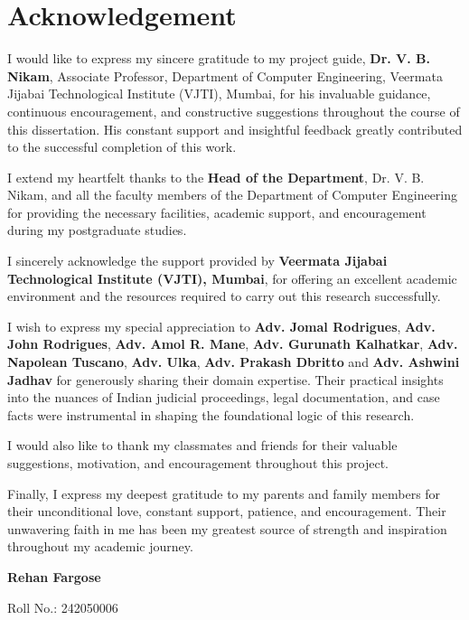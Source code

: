 
\clearpage

\chapter*{Acknowledgement}


\thispagestyle{plain}

I would like to express my sincere gratitude to my project guide, \textbf{Dr. V. B. Nikam}, Associate Professor, Department of Computer Engineering, Veermata Jijabai Technological Institute (VJTI), Mumbai, for his invaluable guidance, continuous encouragement, and constructive suggestions throughout the course of this dissertation. His constant support and insightful feedback greatly contributed to the successful completion of this work.

I extend my heartfelt thanks to the \textbf{Head of the Department}, Dr. V. B. Nikam, and all the faculty members of the Department of Computer Engineering for providing the necessary facilities, academic support, and encouragement during my postgraduate studies.

I sincerely acknowledge the support provided by \textbf{Veermata Jijabai Technological Institute (VJTI), Mumbai}, for offering an excellent academic environment and the resources required to carry out this research successfully.

I wish to express my special appreciation to \textbf{Adv. Jomal Rodrigues}, \textbf{Adv. John Rodrigues}, \textbf{Adv. Amol R. Mane}, \textbf{Adv. Gurunath Kalhatkar}, \textbf{Adv. Napolean Tuscano}, \textbf{Adv. Ulka}, \textbf{Adv. Prakash Dbritto} and \textbf{Adv. Ashwini Jadhav} for generously sharing their domain expertise. Their practical insights into the nuances of Indian judicial proceedings, legal documentation, and case facts were instrumental in shaping the foundational logic of this research. 

I would also like to thank my classmates and friends for their valuable suggestions, motivation, and encouragement throughout this project.

Finally, I express my deepest gratitude to my parents and family members for their unconditional love, constant support, patience, and encouragement. Their unwavering faith in me has been my greatest source of strength and inspiration throughout my academic journey.

\vspace{2cm}

\begin{flushright}
	
	\textbf{Rehan Fargose}
	
	Roll No.: 242050006
	
\end{flushright}